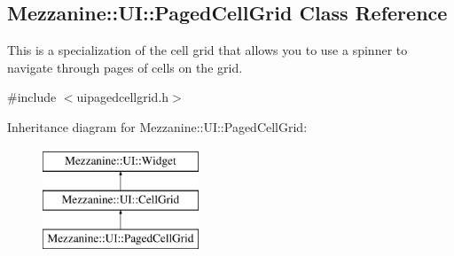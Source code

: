 \hypertarget{classMezzanine_1_1UI_1_1PagedCellGrid}{
\subsection{Mezzanine::UI::PagedCellGrid Class Reference}
\label{classMezzanine_1_1UI_1_1PagedCellGrid}
}


This is a specialization of the cell grid that allows you to use a spinner to navigate through pages of cells on the grid.  




{\ttfamily \#include $<$uipagedcellgrid.h$>$}

Inheritance diagram for Mezzanine::UI::PagedCellGrid:\begin{figure}[H]
\begin{center}
\leavevmode
\includegraphics[height=3.000000cm]{classMezzanine_1_1UI_1_1PagedCellGrid}
\end{center}
\end{figure}
